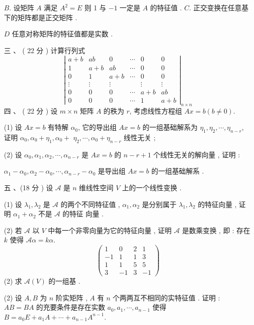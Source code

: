\documentclass[10pt]{article}
\begin{document}
{$B$.  设矩阵  $A$  满足  $A^{2}=E$  则  1  与  $-1$  一定是  $A$  的特征值 . $C$.  正交变换在任意基下的矩阵都是正交矩阵 .

$D$  任意对称矩阵的特征值都是实数 .

 三 、 ( 22  分 )  计算行列式 
$$
\left|\begin{array}{cccccc}
a+b & a b & 0 & \cdots & 0 & 0 \\
1 & a+b & a b & \cdots & 0 & 0 \\
0 & 1 & a+b & \cdots & 0 & 0 \\
\vdots & \vdots & \vdots & & \vdots & \vdots \\
0 & 0 & 0 & \cdots & a+b & a b \\
0 & 0 & 0 & \cdots & 1 & a+b
\end{array}\right|_{n \times n}
$$
 四 、 ( 22  分 )  设  $m \times n$  矩阵  $A$  的秩为  $r$,  考虑线性方程组  $A x=b(b \neq 0)$.

(1)  设  $A x=b$  有特解  $\alpha_{0}$,  它的导出组  $A x=b$  的一组基础解系为  $\eta_{1}, \eta_{2}, \cdots, \eta_{n-r}$,  证明  $\alpha_{0}, \alpha_{0}+\eta_{1}, \alpha_{0}+$ $\eta_{2}, \cdots, \alpha_{0}+\eta_{n-r}$  线性无关 ;

(2)  设  $\alpha_{0}, \alpha_{1}, \alpha_{2}, \cdots, \alpha_{n-r}$  是  $A x=b$  的  $n-r+1$  个线性无关的解向量 ,  证明 :

$\alpha_{1}-\alpha_{0}, \alpha_{2}-\alpha_{0}, \cdots, \alpha_{n-r}-\alpha_{0}$  是导出组  $A x=b$  的一组基础解系 .

 五 、(18  分 )  设  $\mathscr{A}$  是  $n$  维线性空间  $V$  上的一个线性变换 .

(1)  设  $\lambda_{1}, \lambda_{2}$  是  $\mathscr{A}$  的两个不同特征值 , $\alpha_{1}, \alpha_{2}$  是分别属于  $\lambda_{1}, \lambda_{2}$  的特征向量 ,  证明  $\alpha_{1}+\alpha_{2}$  不是  $\mathscr{A}$  的特征   向量 .

(2)  若  $\mathscr{A}$  以  $V$  中每一个非零向量为它的特征向量 ,  证明  $\mathscr{A}$  是数乘变换 ,  即 :  存在  $k$  使得  $\mathscr{A} \alpha=k \alpha$.
$$
\left(\begin{array}{cccc}
1 & 0 & 2 & 1 \\
-1 & 1 & 1 & 3 \\
1 & 1 & 5 & 5 \\
3 & -1 & 3 & -1
\end{array}\right)
$$
(2)  求  $\mathscr{A}(V)$  的一组基 .

(2)  设  $A, B$  为  $n$  阶实矩阵 , $A$  有  $n$  个两两互不相同的实特征值 .  证明 : $A B=B A$  的充要条件是存在实数  $a_{0}, a_{1}, \cdots, a_{n-1}$  使得  $B=a_{0} E+a_{1} A+\cdots+a_{n-1} A^{n-1}$.

}
\end{document}
